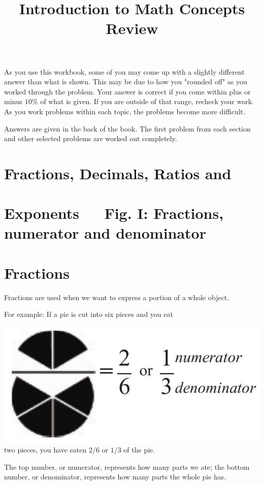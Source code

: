 \documentclass[10pt]{article}
\title{Introduction to Math Concepts Review }
\author{}
\date{}
\begin{document}
\maketitle
As you use this workbook, some of you may come up with a slightly different answer than what is shown. This may be due to how you "rounded off" as you worked through the problem. Your answer is correct if you come within plus or minus $10 \%$ of what is given. If you are outside of that range, recheck your work. As you work problems within each topic, the problems become more difficult.

Answers are given in the back of the book. The first problem from each section and other selected problems are worked out completely.

\section{Fractions, Decimals, Ratios and}
\section{Exponents $\quad$ Fig. I: Fractions, numerator and denominator}
\section{Fractions}
Fractions are used when we want to express a portion of a whole object.

For example: If a pie is cut into six pieces and you eat

\includegraphics[max width=\textwidth]{2022_09_16_4d34b76b97ee13a67df7g-01}\\
two pieces, you have eaten $2 / 6$ or $1 / 3$ of the pie.

The top number, or numerator, represents how many parts we ate; the bottom number, or denominator, represents how many parts the whole pie has.
\end{document}

